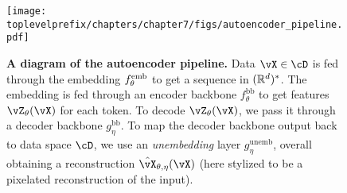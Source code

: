\documentclass[../../book-main.tex]{subfiles}
\begin{document}
\begin{figure}
    \texttt{[image: \\toplevelprefix/chapters/chapter7/figs/autoencoder\_pipeline.pdf]}
    \caption{\small\textbf{A diagram of the autoencoder pipeline.} Data \(\vX \in \cD\) is fed through the embedding \(f_{\theta}^{\mathrm{emb}}\) to get a sequence in \((\mathbb{R}^{d})^{*}\). The embedding is fed through an encoder backbone \(f_{\theta}^{\mathrm{bb}}\) to get features \(\vZ_{\theta}(\vX)\) for each token. To decode \(\vZ_{\theta}(\vX)\), we pass it through a decoder backbone \(g_{\eta}^{\mathrm{bb}}\). To map the decoder backbone output back to data space \(\cD\), we use an \textit{unembedding} layer \(g_{\eta}^{\mathrm{unemb}}\), overall obtaining a reconstruction \(\hat{\vX}_{\theta, \eta}(\vX)\) (here stylized to be a pixelated reconstruction of the input).}
    \label{fig:overall_autoencoder_pipeline}
\end{figure}
\end{document}
